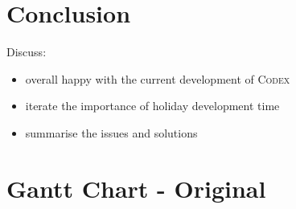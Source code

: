 \documentclass[progress]{cmpreport}
\newcommand{\Codex}{\textsc{Codex}}
\begin{document}
	\section{Conclusion}
	Discuss:
	\begin{itemize}
		\item overall happy with the current development of \Codex
			\subitem 
		\item iterate the importance of holiday development time
		\item summarise the issues and solutions
	\end{itemize}

	\clearpage
	\appendix
	\section{Gantt Chart - Original}
\end{document}

